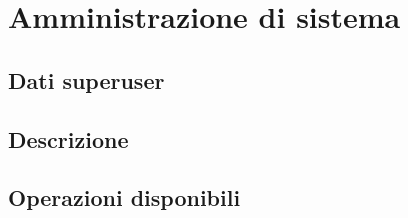 \newpage
\section{Amministrazione di sistema}

\subsection{Dati superuser}

\subsection{Descrizione}

\subsection{Operazioni disponibili}

